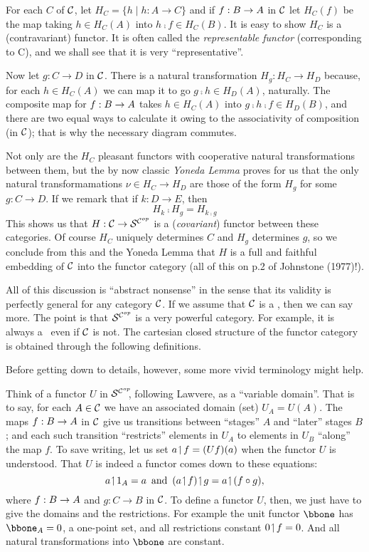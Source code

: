 For each $C$ of $\mathcal C$, let $H_C = \{ h \mid h: A \to C \}$ and if $f: B \rightarrow A$ in $\mathcal C$ let $H_C(f)$ be the map taking $h \in H_C(A)$ into $h \comp f \in H_C(B)$.
It is easy to show $H_C$ is a (contravariant) functor. It is often called the {\it representable functor} (corresponding to C), and we shall see that it is very ``representative''.

Now let $g: C \to D$ in $\mathcal C$. There is a natural transformation
$H_g: H_C \to H_D$ because, for each $h \in H_C(A)$ we can map it to go $g \comp h \in H_D(A)$, naturally. The composite map for $f : B \rightarrow A$
takes $h \in H_C(A)$ into $g \comp h \comp f \in H_D(B)$, and there are two equal
ways to calculate it owing to the associativity of composition (in $\mathcal C$); that is why the necessary diagram commutes.

Not only are the $H_C$ pleasant functors with cooperative natural transformations between them, but the by now classic {\it Yoneda Lemma}
proves for us that the only natural transformamations $\nu \in H_C \to H_D$
are those of the form $H_g$ for some $g: C\to D$. If we remark that if $k:D\to E$, then
\[
H_k \comp H_g = H_{k \comp g}
\]
%
This shows us that $H : \mathcal C \rightarrow \mathcal S^{\mathcal C^{op}}$ is a ({\it covariant}) functor between these categories.
Of course $H_C$ uniquely determines $C$ and
$H_g$ determines $g$, so we conclude from this and the Yoneda Lemma that $H$ is a full and faithful embedding of $\mathcal C$ into the functor
category (all of this on p.2 of Johnstone (1977)!).

All of this discussion is ``abstract nonsense'' in the sense that its validity is perfectly general for any category $\mathcal C$. If we assume that $\mathcal C$ is a \ccc, then we can say more. The point is that $\mathcal S^{\mathcal C^{op}}$ is a very powerful category. For example, it is
always a \ccc\  even if $\mathcal C$ is not. The cartesian closed structure of the functor category is obtained through the following definitions.

Before getting down to details, however, some more vivid terminology might help.

Think of a functor $U$ in $\mathcal S^{\mathcal C^{op}}\!\!$, following Lawvere, as a ``variable domain''.  That is to say, for each $A \in \mathcal C$ we have an associated domain (set) $U_A = U(A)$. The maps $f:B \rightarrow A$ in $\mathcal C$ give us transitions between ``stages'' $A$ and ``later'' stages $B$; and each such transition ``restricts'' elements in
$U_A$ to elements in $U_B$ ``along'' the map $f$. To save writing, let us set $a \!\upharpoonleft\! f = (Uf)(a)$ when the functor $U$ is understood. That $U$ is indeed a functor comes down to these equations:
$$
a \res \id_A = a \,\textrm{ and }\, (a \res f) \res g = a \res (f \comp g),
$$
where  $f : B \rightarrow A$ and $g: C\to B$ in $\mathcal C$. To define a functor $U$, then, we just have to give the domains and the restrictions.
For example the unit functor $\bbone$ has $\bbone_A = {0}$, a one-point set, and all restrictions constant $0 \!\upharpoonleft\! f = 0$. And all natural transformations into $\bbone$ are constant.

